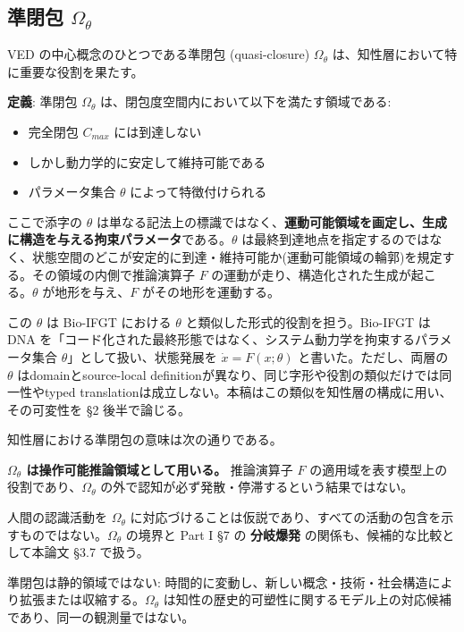 \bigskip


\subsection{準閉包 $\Omega_\theta$}


VED の中心概念のひとつである準閉包 (quasi-closure) $\Omega_\theta$ は、知性層において特に重要な役割を果たす。

\textbf{定義}: 準閉包 $\Omega_\theta$ は、閉包度空間内において以下を満たす領域である:

\begin{itemize}
\item 完全閉包 $C_{max}$ には到達しない
\item しかし動力学的に安定して維持可能である
\item パラメータ集合 $\theta$ によって特徴付けられる
\end{itemize}


ここで添字の $\theta$ は単なる記法上の標識ではなく、\textbf{運動可能領域を画定し、生成に構造を与える拘束パラメータ}である。$\theta$ は最終到達地点を指定するのではなく、状態空間のどこが安定的に到達・維持可能か(運動可能領域の輪郭)を規定する。その領域の内側で推論演算子 $F$ の運動が走り、構造化された生成が起こる。$\theta$ が地形を与え、$F$ がその地形を運動する。

この $\theta$ は Bio-IFGT における $\theta$ と類似した形式的役割を担う。Bio-IFGT は DNA を「コード化された最終形態ではなく、システム動力学を拘束するパラメータ集合 $\theta$」として扱い、状態発展を $\dot{x} = F(x;\theta)$ と書いた。ただし、両層の $\theta$ はdomainとsource-local definitionが異なり、同じ字形や役割の類似だけでは同一性やtyped translationは成立しない。本稿はこの類似を知性層の構成に用い、その可変性を \S{}2 後半で論じる。

知性層における準閉包の意味は次の通りである。

\textbf{$\Omega_\theta$ は操作可能推論領域として用いる。} 推論演算子 $F$ の適用域を表す模型上の役割であり、$\Omega_\theta$ の外で認知が必ず発散・停滞するという結果ではない。

人間の認識活動を $\Omega_\theta$ に対応づけることは仮説であり、すべての活動の包含を示すものではない。$\Omega_\theta$ の境界と Part I \S{}7 の \textbf{分岐爆発} の関係も、候補的な比較として本論文 \S{}3.7 で扱う。

準閉包は静的領域ではない: 時間的に変動し、新しい概念・技術・社会構造により拡張または収縮する。$\Omega_\theta$ は知性の歴史的可塑性に関するモデル上の対応候補であり、同一の観測量ではない。

